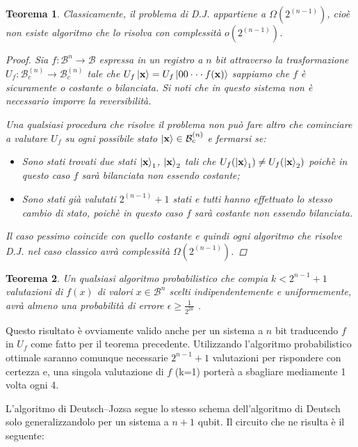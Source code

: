 \documentclass[12pt,a4paper,openright]{report}
\newtheorem{mythm}{Teorema}[chapter]
\begin{document}
\begin{mythm}
 Classicamente, il problema di D.J. appartiene a $\Omega(2^{(n-1)})$, cioè non esiste algoritmo che lo risolva con complessità $o(2^{(n-1)})$.
 \begin{proof}
     Sia $f:\mathcal{B}^n\rightarrow\mathcal{B}$ espressa in un registro a $n$ bit attraverso la trasformazione $U_f: \mathcal{B}_c^{(n)} \rightarrow \mathcal{B}_c^{(n)}$ tale che $U_f\ket{\textbf{x}}=U_f\ket{00\cdot\cdot\cdot f(\textbf{x})}$ sappiamo che $f$ è sicuramente o costante o bilanciata.
     Si noti che in questo sistema non è necessario imporre la reversibilità.\par
     Una qualsiasi procedura che risolve il problema non può fare altro che cominciare a valutare $U_f$ su ogni possibile stato $\ket{\textbf{x}}\in{\mathcal{B}_c^{(n)}}$ e fermarsi se:
     \begin{itemize}
         \item Sono stati trovati due stati $\ket{\textbf{x}}_1$, $\ket{\textbf{x}}_2$ tali che $U_f(\ket{\textbf{x}}_1) \ne U_f(\ket{\textbf{x}}_2)$ poichè in questo caso $f$ sarà bilanciata non essendo costante;
         \item Sono stati già valutati $2^{(n-1)}+1$ stati e tutti hanno effettuato lo stesso cambio di stato, poichè in questo caso $f$ sarà costante non essendo bilanciata.
     \end{itemize} 
     Il caso pessimo coincide con quello costante e quindi ogni algoritmo che risolve D.J. nel caso classico avrà complessità $\Omega(2^{(n-1)})$.
 \end{proof}
\end{mythm}

\begin{mythm}
    Un qualsiasi algoritmo probabilistico che compia $k<2^{n-1}+1$ valutazioni di $f(x)$ di valori $x\in\mathcal{B}^n$ scelti indipendentemente e uniformemente, avrà almeno una probabilità di errore $\epsilon \geq \frac{1}{2^{2k}}$ \cite{ref17}. 
\end{mythm}
Questo risultato è ovviamente valido anche per un sistema a $n$ bit traducendo $f$ in $U_f$ come fatto per il teorema precedente. Utilizzando l'algoritmo probabilistico ottimale saranno comunque necessarie $2^{n-1} + 1$ valutazioni per rispondere con certezza e, una singola valutazione di $f$ (k=1) porterà a sbagliare mediamente 1 volta ogni 4.

\newpage
L'algoritmo di Deutsch–Jozsa segue lo stesso schema dell'algoritmo di Deutsch solo generalizzandolo per un sistema a $n+1$ qubit. Il circuito che ne risulta è il seguente:
\end{document}
